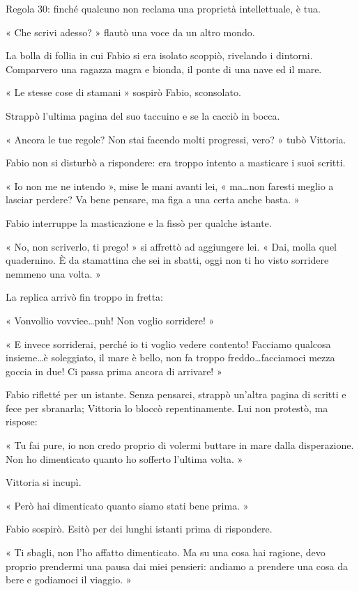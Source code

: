 Regola 30: finché qualcuno non reclama una proprietà intellettuale, è tua.

« Che scrivi adesso? » flautò una voce da un altro mondo.

La bolla di follia in cui Fabio si era isolato scoppiò, rivelando i dintorni. Comparvero una ragazza magra e bionda, il ponte di una nave ed il mare.

« Le stesse cose di stamani » sospirò Fabio, sconsolato.

Strappò l'ultima pagina del suo taccuino e se la cacciò in bocca.

« Ancora le tue regole? Non stai facendo molti progressi, vero? » tubò Vittoria.

Fabio non si disturbò a rispondere: era troppo intento a masticare i suoi scritti.

« Io non me ne intendo », mise le mani avanti lei, « ma\ldots non faresti meglio a lasciar perdere? Va bene pensare, ma figa a una certa anche basta. »

Fabio interruppe la masticazione e la fissò per qualche istante.

« No, non scriverlo, ti prego! » si affrettò ad aggiungere lei. « Dai, molla quel quadernino. È da stamattina che sei in sbatti, oggi non ti ho visto sorridere nemmeno una volta. »

La replica arrivò fin troppo in fretta:

« Vonvollio vovviee\ldots puh! Non voglio sorridere! »

« E invece sorriderai, perché io ti voglio vedere contento! Facciamo qualcosa insieme\ldots è soleggiato, il mare è bello, non fa troppo freddo\ldots facciamoci mezza goccia in due! Ci passa prima ancora di arrivare! »

Fabio rifletté per un istante. Senza pensarci, strappò un'altra pagina di scritti e fece per sbranarla; Vittoria lo bloccò repentinamente. Lui non protestò, ma rispose:

« Tu fai pure, io non credo proprio di volermi buttare in mare dalla disperazione. Non ho dimenticato quanto ho sofferto l'ultima volta. »

Vittoria si incupì.

« Però hai dimenticato quanto siamo stati bene prima. »

Fabio sospirò. Esitò per dei lunghi istanti prima di rispondere.

« Ti sbagli, non l'ho affatto dimenticato. Ma su una cosa hai ragione, devo proprio prendermi una pausa dai miei pensieri: andiamo a prendere una cosa da bere e godiamoci il viaggio. »

